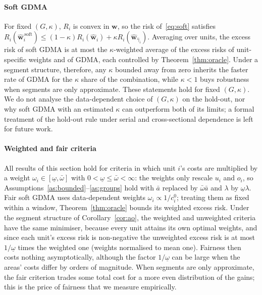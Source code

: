 \paragraph{Soft GDMA}
For fixed $(G,\kappa)$, $R_i$ is convex in $\bm w$, so the risk of~\eqref{eq:soft} satisfies
$R_i(\widehat{\bm w}^{\,\mathrm{soft}}_i)\le(1-\kappa)R_i(\widehat{\bm w}_i)+\kappa R_i(\widehat{\bm w}_{\widehat\gamma_i})$.
Averaging over units, the excess risk of soft GDMA is at most the $\kappa$-weighted average of the excess risks of unit-specific weights and of GDMA, each controlled by Theorem~\ref{thm:oracle}.
Under a segment structure, therefore, any $\kappa$ bounded away from zero inherits the faster rate of GDMA for the $\kappa$ share of the combination, while $\kappa<1$ buys robustness when segments are only approximate.
These statements hold for fixed $(G,\kappa)$.
We do not analyse the data-dependent choice of $(G,\kappa)$ on the hold-out, nor why soft GDMA with an estimated $\kappa$ can outperform both of its limits; a formal treatment of the hold-out rule under serial and cross-sectional dependence is left for future work.


\paragraph{Weighted and fair criteria}
All results of this section hold for criteria in which unit $i$'s costs are multiplied by a weight $\omega_i\in[\underline\omega,\bar\omega]$ with $0<\underline\omega\le\bar\omega<\infty$: the weights only rescale $u_i$ and $o_i$, so Assumptions~\ref{as:bounded}--\ref{as:groups} hold with $\bar a$ replaced by $\bar\omega\bar a$ and $\lambda$ by $\underline\omega\lambda$.
Fair soft GDMA uses data-dependent weights $\omega_i\propto1/c_i^0$; treating them as fixed within a window, Theorem~\ref{thm:oracle} bounds its weighted excess risk.
Under the segment structure of Corollary~\ref{cor:ao}, the weighted and unweighted criteria have the same minimiser, because every unit attains its own optimal weights, and since each unit's excess risk is non-negative the unweighted excess risk is at most $1/\underline\omega$ times the weighted one (weights normalised to mean one).
Fairness then costs nothing asymptotically, although the factor $1/\underline\omega$ can be large when the areas' costs differ by orders of magnitude.
When segments are only approximate, the fair criterion trades some total cost for a more even distribution of the gains; this is the price of fairness that we measure empirically.

